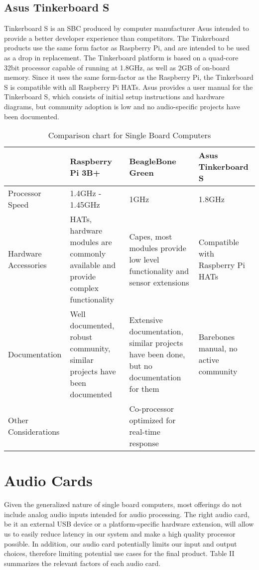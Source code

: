 \documentclass[journal,onecolumn,draftclsnofoot]{IEEEtran}
\begin{document}
\subsection{Asus Tinkerboard S} %
Tinkerboard S is an SBC produced by computer manufacturer Asus intended to provide a better developer experience than competitors\cite{tbs:info}. The Tinkerboard products use the same form factor as Raspberry Pi, and are intended to be used as a drop in replacement.
The Tinkerboard platform is based on a quad-core 32bit processor capable of running at 1.8GHz, as well as 2GB of on-board memory.
Since it uses the same form-factor as the Raspberry Pi, the Tinkerboard S is compatible with all Raspberry Pi HATs.
Asus provides a user manual\cite{tbs:manual} for the Tinkerboard S, which consists of initial setup instructions and hardware diagrams, but community adoption is low and no audio-specific projects have been documented.

\begin{table}[]
\centering
\begin{tabularx}{\linewidth}{X|X|X|X|}

 & Raspberry Pi 3B+ & BeagleBone Green & Asus Tinkerboard S \\ \hline
Processor Speed & 1.4GHz - 1.45GHz & 1GHz & 1.8GHz \\ \hline
Hardware Accessories & HATs, hardware modules are commonly available and provide complex functionality & Capes, most modules provide low level functionality and sensor extensions & Compatible with Raspberry Pi HATs \\ \hline
Documentation & Well documented, robust community, similar projects have been documented & Extensive documentation, similar projects have been done, but no documentation for them & Barebones manual, no active community \\ \hline
Other Considerations &  & Co-processor optimized for real-time response &  \\ \hline
\end{tabularx}
\vspace{.1cm}
\caption{Comparison chart for Single Board Computers}
\label{my-label}
\end{table}

\section{Audio Cards}
Given the generalized nature of single board computers, most offerings do not include analog audio inputs intended for audio processing. The right audio card, be it an external USB device or a platform-specific hardware extension, will allow us to easily reduce latency in our system and make a high quality processor possible. In addition, our audio card potentially limits our input and output choices, therefore limiting potential use cases for the final product. Table II summarizes the relevant factors of each audio card.
\end{document}
